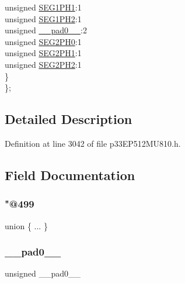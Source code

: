 \begin{DoxyCompactItemize}
\begin{tabbing}
\>\>unsigned \hyperlink{structtag_c1_c_f_g2_b_i_t_s_a2ea6021666df7ddae988097c241776ec}{SEG1PH1}:1\\
\>\>unsigned \hyperlink{structtag_c1_c_f_g2_b_i_t_s_a9403fb28f56e759f1fda0dbe1329530e}{SEG1PH2}:1\\
\>\>unsigned \hyperlink{structtag_c1_c_f_g2_b_i_t_s_adf71f3d8410c1f1dbbc96680a92c49af}{\_\_pad0\_\_}:2\\
\>\>unsigned \hyperlink{structtag_c1_c_f_g2_b_i_t_s_a6b5b806dc664c2ae31bf662fa46431bf}{SEG2PH0}:1\\
\>\>unsigned \hyperlink{structtag_c1_c_f_g2_b_i_t_s_aab8d5f089bad40bef0386f8b84ead0b7}{SEG2PH1}:1\\
\>\>unsigned \hyperlink{structtag_c1_c_f_g2_b_i_t_s_a0c3b275225d845ea8ee18e93711b60df}{SEG2PH2}:1\\
\>\} \\
\}; \\

\end{tabbing}\end{DoxyCompactItemize}


\subsection{Detailed Description}


Definition at line 3042 of file p33\+E\+P512\+M\+U810.\+h.



\subsection{Field Documentation}
\mbox{\label{structtag_c1_c_f_g2_b_i_t_s_aa29e7940f0c4a87ac7fc4e7a7ae248f0}} 
\subsubsection{\texorpdfstring{"@499}{@499}}
{\footnotesize\ttfamily union \{ ... \} }

\mbox{\label{structtag_c1_c_f_g2_b_i_t_s_adf71f3d8410c1f1dbbc96680a92c49af}} 
\subsubsection{\texorpdfstring{\+\_\+\+\_\+pad0\+\_\+\+\_\+}{\_\_pad0\_\_}}
{\footnotesize\ttfamily unsigned \+\_\+\+\_\+pad0\+\_\+\+\_\+}



